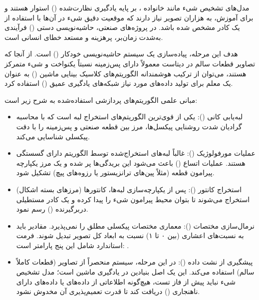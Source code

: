\documentclass{article}
\begin{document}
مدل‌های تشخیص شیء مانند خانواده ، بر پایه یادگیری نظارت‌شده () استوار هستند و برای آموزش، به هزاران تصویر نیاز دارند که موقعیت دقیق شیء در آن‌ها با استفاده از یک کادر مشخص شده باشد. در پروژه‌های صنعتی، حاشیه‌نویسی دستی () فرآیندی به‌شدت زمان‌بر، پرهزینه و مستعد خطای انسانی است.

هدف این مرحله، پیاده‌سازی یک سیستم حاشیه‌نویسی خودکار () است. از آنجا که تصاویر قطعات سالم در دیتاست  معمولاً دارای پس‌زمینه نسبتاً یکنواخت و شیء متمرکز هستند، می‌توان از ترکیب هوشمندانه الگوریتم‌های کلاسیک بینایی ماشین () به عنوان یک معلم برای تولید داده‌های مورد نیاز شبکه‌های یادگیری عمیق () استفاده کرد.

مبانی علمی الگوریتم‌های پردازشی استفاده‌شده به شرح زیر است:

\begin{itemize}
	\item لبه‌یابی کانی (): یکی از قوی‌ترین الگوریتم‌های استخراج لبه است که با محاسبه گرادیان شدت روشنایی پیکسل‌ها، مرز بین قطعه صنعتی و پس‌زمینه را با دقت پیکسلی شناسایی می‌کند.
	\item عملیات مورفولوژیک (): غالباً لبه‌های استخراج‌شده توسط الگوریتم  دارای گسستگی هستند. عملیات اتساع () باعث می‌شود این بریدگی‌ها پر شده و یک مرز یکپارچه پیرامون قطعه (مثلاً پین‌های ترانزیستور یا رزوه‌های پیچ) تشکیل شود.
	\item استخراج کانتور (): پس از یکپارچه‌سازی لبه‌ها، کانتورها (مرزهای بسته اشکال) استخراج می‌شوند تا بتوان محیط پیرامون شیء را پیدا کرده و یک کادر مستطیلی دربرگیرنده () رسم نمود.
	\item نرمال‌سازی مختصات (): معماری  مختصات پیکسلی مطلق را نمی‌پذیرد. مقادیر باید به نسبت‌های اعشاری (بین ۰ تا ۱) نسبت به ابعاد کل تصویر تبدیل شوند. فرمت استاندارد  شامل این پنج پارامتر است: .
	\item پیشگیری از نشت داده (): در این مرحله، سیستم منحصراً از تصاویر  (قطعات کاملاً سالم) استفاده می‌کند. این یک اصل بنیادین در یادگیری ماشین است؛ مدل تشخیص شیء نباید پیش از فاز تست، هیچ‌گونه اطلاعاتی از داده‌های  یا داده‌های دارای ناهنجاری () دریافت کند تا قدرت تعمیم‌پذیری آن مخدوش نشود.
\end{itemize}
\end{document}
